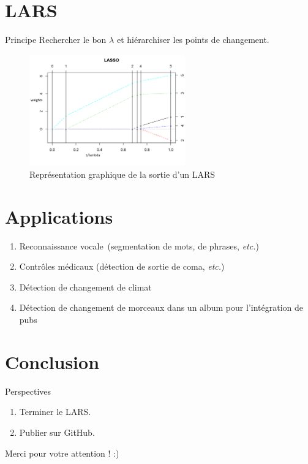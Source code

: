 \documentclass{beamer}
\theoremstyle{definition}
\newcommand{\etc}{\textit{etc.}}
\begin{document}
\section{LARS}
\begin{frame}{\insertsection}
	\begin{block}{Principe}
		Rechercher le bon $\lambda$ et hiérarchiser les points de changement.
	\end{block}
	
	\begin{figure}
		\includegraphics[width=0.6\textwidth]{lars.png}
		\caption{Représentation graphique de la sortie d'un LARS}
		\label{fig:lars}
	\end{figure}
\end{frame}

\section{Applications}
\begin{frame}{\insertsection}
		\begin{enumerate}
			\item Reconnaissance vocale (segmentation de mots, de phrases, \etc)
			\item Contrôles médicaux (détection de sortie de coma, \etc)
			\item Détection de changement de climat
			\item Détection de changement de morceaux dans un album pour l'intégration de pubs
		\end{enumerate}
\end{frame}

\section{Conclusion}
	\begin{frame}{\insertsection}
		\begin{block}{Perspectives}
			\begin{enumerate}
				\item Terminer le LARS.
				\item Publier sur GitHub.
			\end{enumerate}
		\end{block}
		\vfill
		\centering\huge Merci pour votre attention ! :)
	\end{frame}
\end{document}
